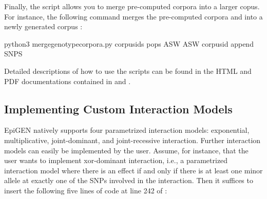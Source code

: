 \documentclass[a4paper,10pt,english]{sphinxhowto}
\begin{document}
Finally, the script  allows you to merge pre-computed corpora into a larger copus. For instance, the following command merges the pre-computed corpora  and  into a newly generated corpus :

\begin{sphinxVerbatim}[commandchars=\\\{\}]
python3 merge\PYGZus{}genotype\PYGZus{}corpora.py \PYGZhy{}\PYGZhy{}corpus\PYGZhy{}ids   \PYGZhy{}\PYGZhy{}pops ASW ASW \PYGZhy{}\PYGZhy{}corpus\PYGZhy{}id  \PYGZhy{}\PYGZhy{}append SNPS
\end{sphinxVerbatim}

Detailed descriptions of how to use the scripts can be found in the HTML and PDF documentations contained in  and .


\subsection{Implementing Custom Interaction Models}
\label{\detokenize{README:implementing-custom-interaction-models}}
EpiGEN natively supports four parametrized interaction models: exponential, multiplicative, joint-dominant, and joint-recessive interaction. Further interaction models can easily be implemented by the user. Assume, for instance, that the user wants to implement xor-dominant interaction, i.e., a parametrized interaction model where there is an effect if and only if there is at least one minor allele at exactly one of the SNPs involved in the interaction. Then it suffices to insert the following five lines of code at line 242 of :

\begin{sphinxVerbatim}[commandchars=\\\{\}]
   
	 \PYG{p}{[}\PYG{p}{]}  
		 
		 
\end{sphinxVerbatim}
\end{document}
